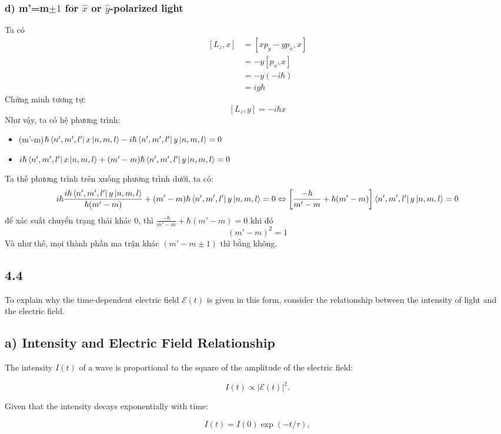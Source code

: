 \documentclass{article}
\begin{document}
\subsubsection*{d) m'=m$\pm1$ for $\hat{x}$ or $\hat{y}$-polarized light}
Ta có
\begin{equation}
	\begin{split}
	[L_z,x]&=[xp_y-yp_x,x]\\
	&=-y[p_x,x]\\
	&=-y(-i\hbar)\\
	&=iy\hbar
	\end{split}
\end{equation}
Chứng minh tương tự: $$[L_z,y]=-i\hbar x$$
Như vậy, ta có hệ phương trình:
\begin{itemize}
	\item (m'-m)$\hbar\bra{n',m',l'}x\ket{n,m,l}-i\hbar \bra{n',m',l'}y\ket{n,m,l}=0$
	\item $i\hbar \bra{n',m',l'}x\ket{n,m,l} + (m'-m)\hbar \bra{n',m',l'}y\ket{n,m,l}=0$
\end{itemize}
Ta thế phương trình trên xuống phương trình dưới, ta có:
$$i\hbar\frac{i\hbar\bra{n',m',l'}y\ket{n,m,l}}{\hbar(m'-m)}+(m'-m)\hbar \bra{n',m',l'}y\ket{n,m,l}=0\\
\Leftrightarrow \left[\frac{-\hbar}{m'-m}+\hbar(m'-m)\right]\bra{n',m',l'}y\ket{n,m,l}=0$$
để xác suất chuyển trạng thái khác 0, thì $\frac{-\hbar}{m'-m}+\hbar(m'-m)=0$
khi đó $$(m'-m)^2=1$$
Và như thế, mọi thành phần ma trận khác $(m'-m\pm1)$ thì bằng không.
\subsection*{4.4}
	To explain why the time-dependent electric field \(\mathcal{E}(t)\) is given in this form, consider the relationship between the intensity of light and the electric field.
	
	\subsection*{a) Intensity and Electric Field Relationship}
	
	The intensity \(I(t)\) of a wave is proportional to the square of the amplitude of the electric field:
	
	\[
	I(t) \propto |\mathcal{E}(t)|^2.
	\]
	
	Given that the intensity decays exponentially with time:
	
	\[
	I(t) = I(0) \exp(-t/\tau),
	\]
	
\end{document}
